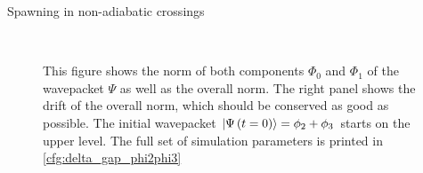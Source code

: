 \begin{chapter}{Spawning in non-adiabatic crossings}
\begin{figure}[h!]
  \centering
   \\
  \caption[Norms and norm drift for a superposition $\phi_2+\phi_3$ in an avoided crossing]{
  This figure shows the norm of both components $\Phi_0$ and $\Phi_1$ of the
  wavepacket $\Psi$ as well as the overall norm. The right panel shows the drift
  of the overall norm, which should be conserved as good as possible.
  The initial wavepacket $\Ket{\Psi\left( t=0 \right)} = \phi_2 + \phi_3$ starts on the
  upper level. The full set of simulation parameters is printed in \ref{cfg:delta_gap_phi2phi3}
  \label{fig:basic_delta_gap_phi2phi3_norms}
  }
\end{figure}



\end{chapter}
